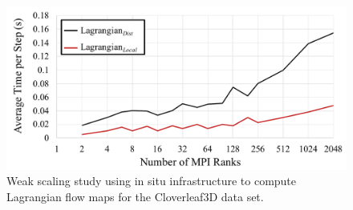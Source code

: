 \begin{figure}[!b]
\centering
\includegraphics[width=0.9\linewidth]{Images/total_time.pdf}
\caption{Weak scaling study using in situ infrastructure to compute Lagrangian flow maps for the Cloverleaf3D data set.}
\label{fig:total_time}
\end{figure}
